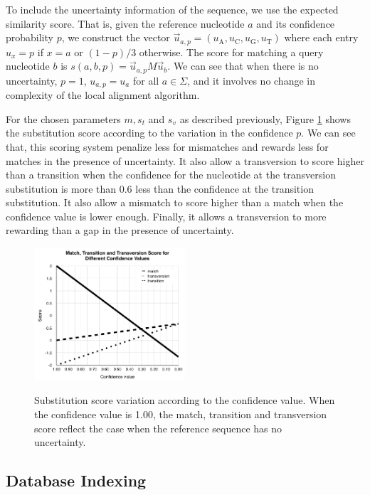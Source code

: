 \documentclass{article}
\begin{document}
To include the uncertainty information of the sequence, we use the expected similarity score. That is, given the reference nucleotide $a$ and its confidence probability $p$, we construct the vector $\vec{u}_{a,p} = (u_{\mbox{A}}, u_{\mbox{C}}, u_{\mbox{G}}, u_{\mbox{T}})$ where each entry $u_x = p$ if $x=a$ or $(1-p)/3$ otherwise. The score for matching a query nucleotide $b$ is $s(a,b,p) = \vec{u}_{a,p}M\vec{u}_b$. We can see that when there is no uncertainty, $p=1$, $u_{a,p} = u_a$ for all $a \in \Sigma$, and it involves no change in complexity of the local alignment algorithm. 

For the chosen parameters $m, s_t$ and $s_v$ as described previously, Figure \ref{figure:score_graphs} shows the substitution score according to the variation in the confidence $p$. We can see that, this scoring system penalize less for mismatches and rewards less for matches in the presence of uncertainty. It also allow a transversion to score higher than a transition when the confidence for the nucleotide at the transversion substitution is more than 0.6 less than the confidence at the transition substitution. It also allow a mismatch to score higher than a match when the confidence value is lower enough. Finally, it allows a transversion to more rewarding than a gap in the presence of uncertainty. 

\begin{figure}[tbp]
\begin{center}
\caption{Substitution score variation according to the confidence value. When the confidence value is 1.00, the match, transition and transversion score reflect the case when the reference sequence has no uncertainty.}
   \includegraphics[width=0.50\textwidth]{score_graph}
\label{figure:score_graphs}
\end{center}
\end{figure}

\subsection{Database Indexing}
\end{document}
